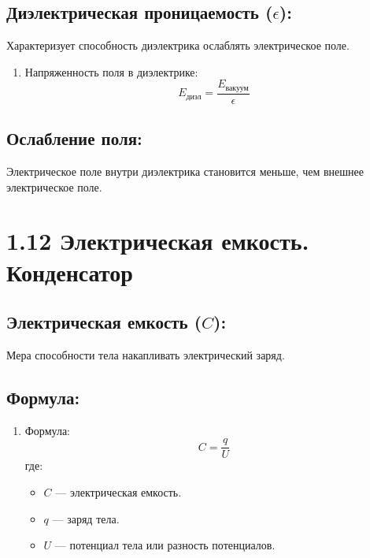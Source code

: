 \documentclass[a4paper,12pt]{article}
\begin{document}
\vspace{-9pt}
\subsection*{Диэлектрическая проницаемость ($\epsilon$):}
\vspace{-3pt}
Характеризует способность диэлектрика ослаблять электрическое поле.
\begin{enumerate}[itemsep=0pt, topsep=0pt, parsep=3pt]
  \item Напряженность поля в диэлектрике:
  \vspace{-0.05em}
  $$ E_{\text{диэл}} = \frac{E_{\text{вакуум}}}{\epsilon} $$
\end{enumerate}

\vspace{-9pt} 
\subsection*{Ослабление поля:}
\vspace{-3pt}
Электрическое поле внутри диэлектрика становится меньше, чем внешнее электрическое поле.

\section*{1.12 Электрическая емкость. Конденсатор}
\vspace{-9pt}
\subsection*{Электрическая емкость ($C$):}
\vspace{-3pt}
Мера способности тела накапливать электрический заряд.

\vspace{-9pt}
\subsection*{Формула:}
\vspace{-3pt}
\begin{enumerate}[itemsep=0pt, topsep=0pt, parsep=3pt]
  \item Формула:
  \vspace{-0.05em}
  $$ C = \frac{q}{U} $$
  где:
  \begin{itemize} [itemsep=0pt, topsep=0pt, parsep=0pt]
    \item $C$ — электрическая емкость.
    \item $q$ — заряд тела.
    \item $U$ — потенциал тела или разность потенциалов.
  \end{itemize}
\end{enumerate}
\end{document}
